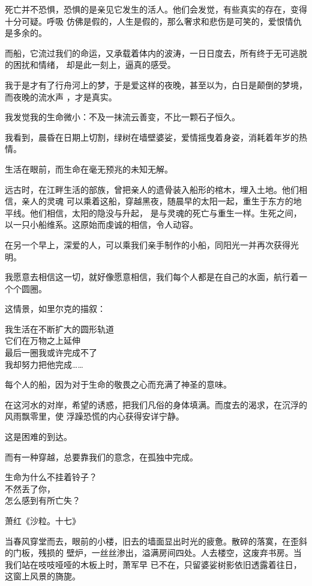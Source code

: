 \documentclass[12pt,a4paper]{article}
\begin{document}
		死亡并不恐惧，恐惧的是亲见它发生的活人。他们会发觉，有些真实的存在，变得十分可疑。呼吸
	仿佛是假的，人生是假的，那么奢求和悲伤是可笑的，爱恨情仇是多余的。

		而船，它流过我们的命运，又承载着体内的波涛，一日日度去，所有终于无可逃脱的困扰和情绪，
	却是此一刻上，逼真的感受。

		我于是才有了行舟河上的梦，于是爱这样的夜晚，甚至以为，白日是颠倒的梦境，而夜晚的流水声
	，才是真实。

		我发觉我的生命微小：不及一抹流云善变，不比一颗石子恒久。

		我看到，晨昏在日期上切割，绿树在墙壁婆娑，爱情摇曳着身姿，消耗着年岁的热情。


		生活在眼前，而生命在毫无预兆的未知无解。


		远古时，在江畔生活的部族，曾把亲人的遗骨装入船形的棺木，埋入土地。他们相信，亲人的灵魂
	可以乘着这船，穿越黑夜，随晨早的太阳一起，重生于东方的地平线。他们相信，太阳的隐没与升起，
	是与灵魂的死亡与重生一样。生死之间，以一只小船维系。这原始而虔诚的相信，令人动容。


		在另一个早上，深爱的人，可以乘我们亲手制作的小船，同阳光一并再次获得光明。

		我愿意去相信这一切，就好像愿意相信，我们每个人都是在自己的水面，航行着一个个圆圈。


		这情景，如里尔克的描叙：

		\longpoem{}{}{}
		我生活在不断扩大的圆形轨道 \\
		它们在万物之上延伸 \\
		最后一圈我或许完成不了 \\
		我却努力把他完成……
		\endlongpoem


		每个人的船，因为对于生命的敬畏之心而充满了神圣的意味。

		在这河水的对岸，希望的诱惑，把我们凡俗的身体填满。而度去的渴求，在沉浮的风雨飘零里，使
	浮躁恐慌的内心获得安详宁静。

		这是困难的到达。


		而有一种穿越，总要靠我们的意念，在孤独中完成。

	\endwriting



		\longpoem{}{}{}
		生命为什么不挂着铃子？\\
		不然丢了你，\\
		怎么感到有所亡失？

		萧红《沙粒。十七》
		\endlongpoem


		当春风穿堂而去，眼前的小楼，旧去的墙面显出时光的疲惫。散碎的落寞，在歪斜的门板，残损的
	壁炉，一丝丝渗出，溢满房间四处。人去楼空，这废弃书房。当我们站在吱吱哑哑的木板上时，萧军早
	已不在，只留婆娑树影依旧透露着往日，这窗上风景的旖旎。
\end{document}
